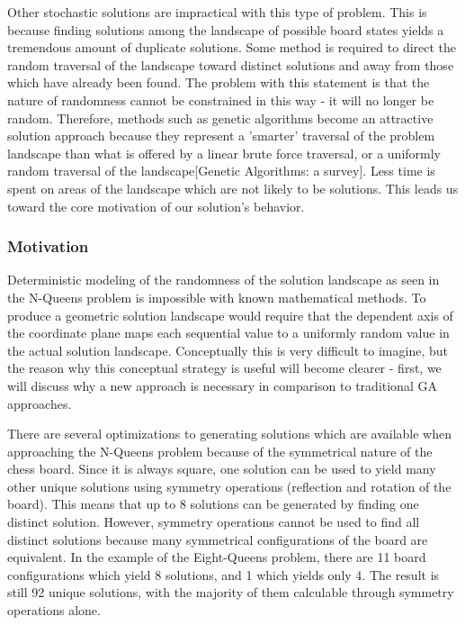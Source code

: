 \documentclass{sig-alternate}
\begin{document}
Other stochastic solutions are impractical with this type of problem. This is because finding solutions among the landscape of possible board states yields a tremendous amount of duplicate solutions. Some method is required to direct the random traversal of the landscape toward distinct solutions and away from those which have already been found. The problem with this statement is that the nature of randomness cannot be constrained in this way - it will no longer be random. Therefore, methods such as genetic algorithms become an attractive solution approach  because they represent a 'smarter' traversal of the problem landscape than what is offered by a linear brute force traversal, or a uniformly random traversal of the landscape[Genetic Algorithms: a survey]. Less time is spent on areas of the landscape which are not likely to be solutions. This leads us toward the core motivation of our solution's behavior.

\subsubsection{Motivation}\label{motivation_section}
Deterministic modeling of the randomness of the solution landscape as seen in the N-Queens problem is impossible with known mathematical methods. To produce a geometric solution landscape would require that the dependent axis of the coordinate plane maps each sequential value to a uniformly random value in the actual solution landscape. Conceptually this is very difficult to imagine, but the reason why this conceptual strategy is useful will become clearer - first, we will discuss why a new approach is necessary in comparison to traditional GA approaches.

There are several optimizations to generating solutions which are available when approaching the N-Queens problem because of the symmetrical nature of the chess board. Since it is always square, one solution can be used to yield many other unique solutions using symmetry operations (reflection and rotation of the board). This means that up to 8 solutions can be generated by finding one distinct solution. However, symmetry operations cannot be used to find all distinct solutions because many symmetrical configurations of the board are equivalent. In the example of the Eight-Queens problem, there are 11 board configurations which yield 8 solutions, and 1 which yields only 4. The result is still 92 unique solutions, with the majority of them calculable through symmetry operations alone.
\end{document}
